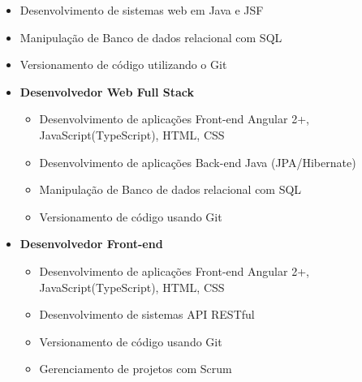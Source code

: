 





\begin{itemize}
\item Desenvolvimento de sistemas web em Java e JSF
\smallskip
\item Manipulação de Banco de dados relacional com SQL
\smallskip
\item Versionamento de código utilizando o Git
\smallskip
\end{itemize}

\divider

\smallskip
\begin{itemize}
\item {\textbf {Desenvolvedor Web Full Stack}\hspace{2mm}} 
\smallskip
\begin{itemize}
    \smallskip
    \item Desenvolvimento de aplicações Front-end Angular 2+, JavaScript(TypeScript), HTML, CSS
    \smallskip
    \item Desenvolvimento de aplicações Back-end Java (JPA/Hibernate)
    \smallskip 
    \item Manipulação de Banco de dados relacional com SQL
    \item Versionamento de código usando Git
    \smallskip
\end{itemize}
\smallskip
\item {\textbf {Desenvolvedor Front-end}\hspace{2mm}} 
\smallskip
\begin{itemize}
    \smallskip
    \item Desenvolvimento de aplicações Front-end Angular 2+, JavaScript(TypeScript), HTML, CSS
    \smallskip
    \item Desenvolvimento de sistemas API RESTful
    \item Versionamento de código usando Git
    \item Gerenciamento de projetos com Scrum
    \smallskip
\end{itemize}

\end{itemize}


